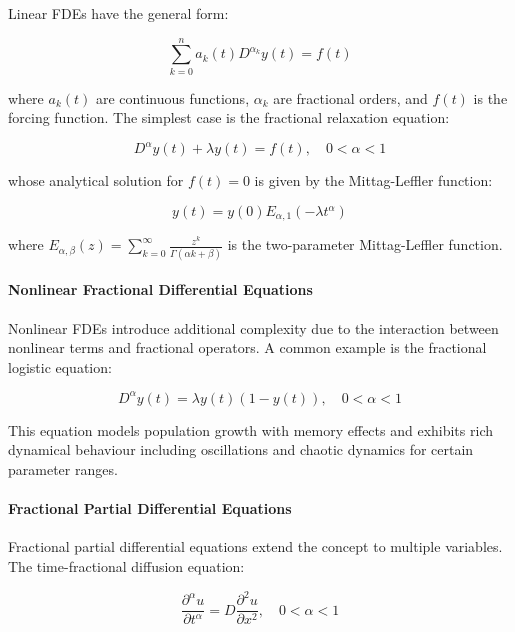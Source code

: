 Linear FDEs have the general form:

\begin{equation}
\sum_{k=0}^{n} a_k(t) D^{\alpha_k} y(t) = f(t)
\end{equation}

where $a_k(t)$ are continuous functions, $\alpha_k$ are fractional orders, and $f(t)$ is the forcing function. The simplest case is the fractional relaxation equation:

\begin{equation}
D^{\alpha} y(t) + \lambda y(t) = f(t), \quad 0 < \alpha < 1
\end{equation}

whose analytical solution for $f(t) = 0$ is given by the Mittag-Leffler function:

\begin{equation}
y(t) = y(0) E_{\alpha,1}(-\lambda t^{\alpha})
\end{equation}

where $E_{\alpha,\beta}(z) = \sum_{k=0}^{\infty} \frac{z^k}{\Gamma(\alpha k + \beta)}$ is the two-parameter Mittag-Leffler function.

\paragraph{Nonlinear Fractional Differential Equations}

Nonlinear FDEs introduce additional complexity due to the interaction between nonlinear terms and fractional operators. A common example is the fractional logistic equation:

\begin{equation}
D^{\alpha} y(t) = \lambda y(t)(1 - y(t)), \quad 0 < \alpha < 1
\end{equation}

This equation models population growth with memory effects and exhibits rich dynamical behaviour including oscillations and chaotic dynamics for certain parameter ranges.

\paragraph{Fractional Partial Differential Equations}

Fractional partial differential equations extend the concept to multiple variables. The time-fractional diffusion equation:

\begin{equation}
\frac{\partial^{\alpha} u}{\partial t^{\alpha}} = D \frac{\partial^2 u}{\partial x^2}, \quad 0 < \alpha < 1
\end{equation}


